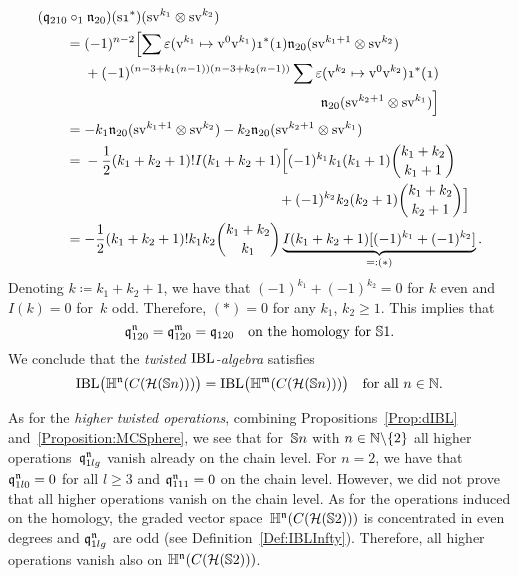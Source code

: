 \documentclass[\MainFolder/Text.tex]{subfiles}
\begin{document}
\begin{align*}
&(\OPQ_{210}\circ_1\PMC_{20})(\Susp\NOne^*)(\Susp\NVol^{k_1} \otimes \Susp\NVol^{k_2}) \\ &\qquad = \begin{multlined}[t](-1)^{n-2}\Bigl[\sum \varepsilon(\NVol^{k_1} \mapsto \NVol^0 \NVol^{k_1}) \NOne^*(\NOne) \PMC_{20}(\Susp\NVol^{k_1+1}\otimes \Susp \NVol^{k_2}) \\ {}+ (-1)^{(n-3 + k_1(n-1))(n-3 + k_2(n-1))} \sum \varepsilon(\NVol^{k_2} \mapsto \NVol^0 \NVol^{k_2})  \NOne^*(\NOne)\\ \PMC_{20}(\Susp \NVol^{k_2 + 1} \otimes\Susp\NVol^{k_1})\Bigr] \end{multlined}
\\&\qquad = -  k_1 \PMC_{20}(\Susp\NVol^{k_1+1}\otimes\Susp\NVol^{k_2}) -  k_2 \PMC_{20}(\Susp\NVol^{k_2+1}\otimes\Susp\NVol^{k_1}) \\ 
&\qquad = \begin{multlined}[t] -\frac{1}{2}(k_1+k_2+1)!I(k_1+k_2+1)\Bigl[(-1)^{k_1} k_1 (k_1+1) \binom{k_1+k_2}{k_1+1} \\ {}+ (-1)^{k_2} k_2  (k_2+1) \binom{k_1+k_2}{k_2+1}\Bigr] \end{multlined} \\ 
&\qquad =  -\frac{1}{2}(k_1+k_2+1)! k_1 k_2 \binom{k_1+k_2}{k_1} \underbrace{I(k_1 + k_2 + 1) [(-1)^{k_1} + (-1)^{k_2}]}_{=:(*)}.
\end{align*}
%
Denoting $k\coloneqq k_1 + k_2 + 1$, we have that $(-1)^{k_1} + (-1)^{k_2} = 0$ for $k$ even and $I(k) = 0$ for~$k$ odd. Therefore, $(*) = 0$ for any $k_1$, $k_2\ge 1$.
This implies that 
$$ \mathfrak{q}_{120}^{\mathfrak{n}} = \mathfrak{q}_{120}^{\mathfrak{m}} = \mathfrak{q}_{120}\quad\text{on the homology for }\mathbb{S}{1}. $$
We conclude that the \emph{twisted $\mathrm{IBL}$-algebra} satisfies
$$ \mathrm{IBL}\bigl(\mathbb{H}^{\mathfrak{n}}(C(\mathcal{H}(\mathbb{S}{n})))\bigr) = \mathrm{IBL}\bigl(\mathbb{H}^{\mathfrak{m}}(C(\mathcal{H}(\mathbb{S}{n})))\bigr) \quad\text{for all }n\in \mathbb{N}. $$

As for the \emph{higher twisted operations}, combining Propositions~\ref{Prop:dIBL} and~\ref{Proposition:MCSphere}, we see that for~$\mathbb{S}{n}$ with $n\in \mathbb{N}\backslash\{2\}$ all higher operations~$\mathfrak{q}_{1lg}^{\mathfrak{n}}$ vanish already on the chain level. For $n=2$, we have that $\mathfrak{q}_{1l0}^{\mathfrak{n}} = 0$ for all $l\ge 3$ and $\mathfrak{q}_{111}^{\mathfrak{n}} = 0$ on the chain level. However, we did not prove that all higher operations vanish on the chain level. As for the operations induced on the homology, the graded vector space~$\mathbb{H}^{\mathfrak{n}}(C(\mathcal{H}(\mathbb{S}{2})))$ is concentrated in even degrees and $\mathfrak{q}_{1lg}^{\mathfrak{n}}$ are odd (see Definition~\ref{Def:IBLInfty}). Therefore, all higher operations vanish also on $\mathbb{H}^{\mathfrak{n}}(C(\mathcal{H}(\mathbb{S}{2})))$.
\end{document}
